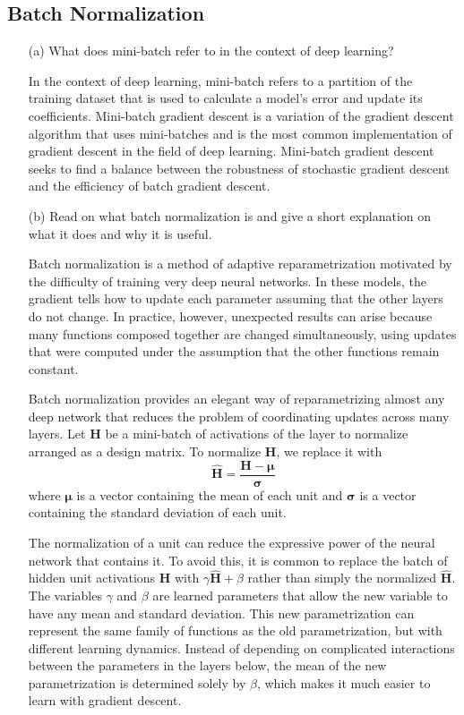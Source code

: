 \documentclass{article}
\newcommand{\matr}[1]{\bm{#1}}     %
\newcommand{\vect}[1]{\bm{#1}}     %
\begin{document}
\newpage

\subsection{Batch Normalization}
\begin{itemize}
    \item[(a)] What does mini-batch refer to in the context of deep learning?
    
    In the context of deep learning, mini-batch refers to a partition of the training dataset that is used to calculate a model's error and update its coefficients. Mini-batch gradient descent is a variation of the gradient descent algorithm that uses mini-batches and is the most common implementation of gradient descent in the field of deep learning. Mini-batch gradient descent seeks to find a balance between the robustness of stochastic gradient descent and the efficiency of batch gradient descent.
    
    \item[(b)] Read on what batch normalization is and give a short explanation on what it does and why it is useful.
    
    Batch normalization is a method of adaptive reparametrization motivated by the difficulty of training very deep neural networks. In these models, the gradient tells how to update each parameter assuming that the other layers do not change. In practice, however, unexpected results can arise because many functions composed together are changed simultaneously, using updates that were computed under the assumption that the other functions remain constant.
    
    Batch normalization provides an elegant way of reparametrizing almost any deep network that reduces the problem of coordinating updates across many layers. Let $\matr{H}$ be a mini-batch of activations of the layer to normalize arranged as a design matrix. To normalize $\matr{H}$, we replace it with 
    \begin{equation*}
        \hat{\matr{H}} = \frac{\matr{H}-\vect{\mu}}{\vect{\sigma}}
    \end{equation*}
    where $\vect{\mu}$ is a vector containing the mean of each unit and $\vect{\sigma}$ is a vector containing the standard deviation of each unit.
    
    The normalization of a unit can reduce the expressive power of the neural network that contains it. To avoid this, it is common to replace the batch of hidden unit activations $\matr{H}$ with $\gamma\hat{\matr{H}}+\beta$ rather than simply the normalized $\hat{\matr{H}}$. The variables $\gamma$ and $\beta$ are learned parameters that allow the new variable to have any mean and standard deviation. This new parametrization can represent the same family of functions as the old parametrization, but with different learning dynamics. Instead of depending on complicated interactions between the parameters in the layers below, the mean of the new parametrization is determined solely by $\beta$, which makes it much easier to learn with gradient descent.
\end{itemize}
\end{document}
